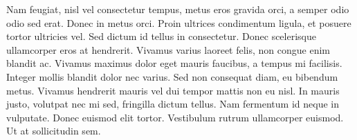 Nam feugiat, nisl vel consectetur tempus, metus eros gravida orci, a semper odio odio sed erat. Donec in metus orci. Proin ultrices condimentum ligula, et posuere tortor ultricies vel. Sed dictum id tellus in consectetur. Donec scelerisque ullamcorper eros at hendrerit. Vivamus varius laoreet felis, non congue enim blandit ac. Vivamus maximus dolor eget mauris faucibus, a tempus mi facilisis. Integer mollis blandit dolor nec varius. Sed non consequat diam, eu bibendum metus. Vivamus hendrerit mauris vel dui tempor mattis non eu nisl. In mauris justo, volutpat nec mi sed, fringilla dictum tellus. Nam fermentum id neque in vulputate. Donec euismod elit tortor. Vestibulum rutrum ullamcorper euismod. Ut at sollicitudin sem.